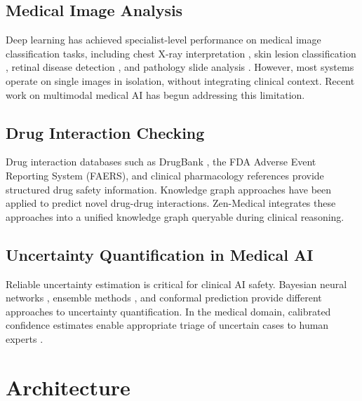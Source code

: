 \documentclass[11pt,a4paper]{article}
\begin{document}
\subsection{Medical Image Analysis}

Deep learning has achieved specialist-level performance on medical image classification tasks, including chest X-ray interpretation \citep{rajpurkar2017chexnet}, skin lesion classification \citep{esteva2017dermatologist}, retinal disease detection \citep{de2018clinically}, and pathology slide analysis \citep{campanella2019clinical}. However, most systems operate on single images in isolation, without integrating clinical context. Recent work on multimodal medical AI \citep{moor2023foundation,tu2024towards} has begun addressing this limitation.

\subsection{Drug Interaction Checking}

Drug interaction databases such as DrugBank \citep{wishart2018drugbank}, the FDA Adverse Event Reporting System (FAERS), and clinical pharmacology references provide structured drug safety information. Knowledge graph approaches \citep{zitnik2018modeling,lin2020kgnn} have been applied to predict novel drug-drug interactions. Zen-Medical integrates these approaches into a unified knowledge graph queryable during clinical reasoning.

\subsection{Uncertainty Quantification in Medical AI}

Reliable uncertainty estimation is critical for clinical AI safety. Bayesian neural networks \citep{gal2016dropout}, ensemble methods \citep{lakshminarayanan2017simple}, and conformal prediction \citep{angelopoulos2021gentle} provide different approaches to uncertainty quantification. In the medical domain, calibrated confidence estimates enable appropriate triage of uncertain cases to human experts \citep{jiang2012calibrating}.

\section{Architecture}
\label{sec:architecture}
\end{document}
